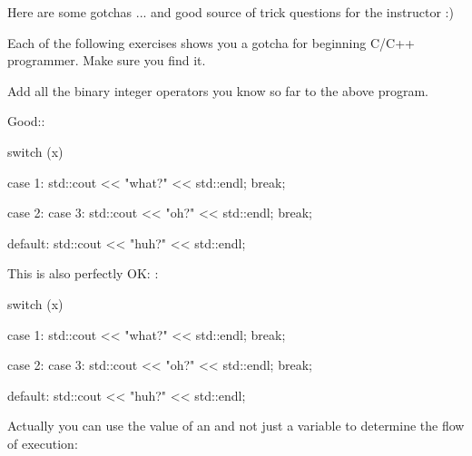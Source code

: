 Here are some gotchas ... and good source of trick questions for the
instructor :)

Each of the following exercises shows you a gotcha for beginning C/C++
programmer. Make sure you find it.






Add all the binary integer operators you know so far to the above
program.

\newpage{}

Good::
\begin{console}
switch (x)
{
        case 1:
             std::cout << "what?" << std::endl;
             break;
             
        case 2:
        case 3:
             std::cout << "oh?" << std::endl;
             break;
             
        default:
             std::cout << "huh?" << std::endl;
}

\end{console}
This is also perfectly OK: :
\begin{console}
switch (x)
{
        case 1:
        {
             std::cout << "what?" << std::endl;
             break;
        }
        
        case 2:
        case 3:
        {
             std::cout << "oh?" << std::endl;
             break;
        }
        
        default:
        {
             std::cout << "huh?" << std::endl;
        }
}
\end{console}
\newpage{}

Actually you can use the value of an  and not
just a variable to determine the flow of execution:

